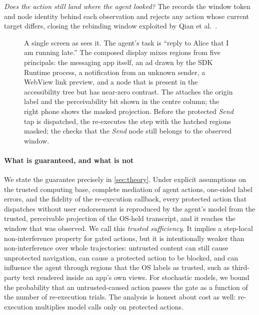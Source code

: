 \emph{Does the action still land where the agent looked?} The \DB{} records the window token and node identity behind each observation and rejects any action whose current target differs, closing the rebinding window exploited by Qian et al.~\cite{qian2026zeropermission}.

\begin{figure}[t]
  \centering
  
  \caption{A single screen as \PG{} sees it. The agent's task is ``reply to Alice that I am running late.'' The composed display mixes regions from five principals: the messaging app itself, an ad drawn by the SDK Runtime process, a notification from an unknown sender, a WebView link preview, and a node that is present in the accessibility tree but has near-zero contrast. The \LS{} attaches the origin label and the perceivability bit shown in the centre column; the right phone shows the masked projection. Before the protected \emph{Send} tap is dispatched, the \CG{} re-executes the step with the hatched regions masked; the \DB{} checks that the \emph{Send} node still belongs to the observed window.}
  \label{fig:labeled-screen}
\end{figure}

\paragraph{What is guaranteed, and what is not}
We state the guarantee precisely in \cref{sec:theory}. Under explicit assumptions on the trusted computing base, complete mediation of agent actions, one-sided label errors, and the fidelity of the re-execution callback, every protected action that \PG{} dispatches without user endorsement is reproduced by the agent's model from the trusted, perceivable projection of the OS-held transcript, and it reaches the window that was observed. We call this \emph{trusted sufficiency}. It implies a step-local non-interference property for gated actions, but it is intentionally weaker than non-interference over whole trajectories: untrusted content can still cause unprotected navigation, can cause a protected action to be blocked, and can influence the agent through regions that the OS labels as trusted, such as third-party text rendered inside an app's own views. For stochastic models, we bound the probability that an untrusted-caused action passes the gate as a function of the number of re-execution trials. The analysis is honest about cost as well: re-execution multiplies model calls only on protected actions.

